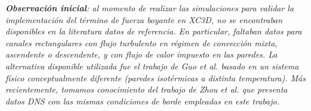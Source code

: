 \textit{\textbf{Observación inicial}: al momento de realizar las simulaciones para validar la implementación del término de fuerza boyante en XC3D, no se encontraban disponibles en la literatura datos de referencia. En particular, faltaban datos para canales rectangulares con flujo turbulento en régimen de convección mixta, ascendente o descendente, y con flujo de calor impuesto en las paredes. La alternativa disponible utilizada fue el trabajo de Guo \textit{et al.} \cite{guo2022direct} basado en un sistema físico conceptualmente diferente (paredes isotérmicas a distinta temperatura). Más recientemente, tomamos conocimiento del trabajo de Zhou \textit{et al.} \cite{zhou2024direct} que presenta datos DNS con las mismas condiciones de borde empleadas en este trabajo.}


\begin{figure}[H]
 \centering


\end{figure}
